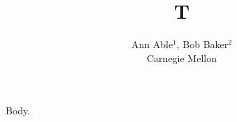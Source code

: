 \documentclass{article}
\begin{document}
\title{T}
\author{Ann Able$^{1}$, Bob Baker$^{2}$ \\ Carnegie Mellon}
\maketitle
Body.
\end{document}

